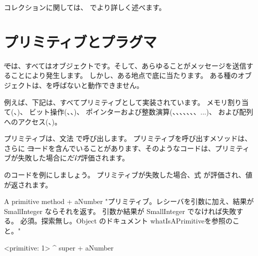 \documentclass[a4paper,10pt,twoside]{book}
\begin{document}
コレクションに関しては、 でより詳しく述べます。

\section{プリミティブとプラグマ}

\st では、すべてはオブジェクトです。そして、あらゆることがメッセージを送信することにより発生します。
しかし、ある地点で底に当たります。
ある種のオブジェクトは、を呼ばないと動作できません。

例えば、下記は、すべてプリミティブとして実装されています。
メモリ割り当て(、)、
ビット操作(、、)、
ポインターおよび整数演算(\ct{+}、\ct{-}、\ct{<}、\ct{>}、\ct{*}、\ct{/ }、\ct{=}、\ct{==}...)、
および配列へのアクセス(、)。

プリミティブは、文法  で呼び出します。
プリミティブを呼び出すメソッドは、さらに \st コードを含んでいることがあります、そのようなコードは、プリミティブが失敗した場合に\emph{だけ}評価されます。

のコードを例にしましょう。
プリミティブが失敗した場合、式  が評価され、値が返されます。

\begin{method}[primitive]{A primitive method}
+ aNumber 
  "プリミティブ。レシーバを引数に加え、結果が SmallInteger ならそれを返す。
  引数か結果が SmallInteger でなければ失敗する。
  必須。探索無し。Object のドキュメント whatIsAPrimitiveを参照のこと。"

  <primitive: 1>
  ^ super + aNumber
\end{method}

\end{document}

